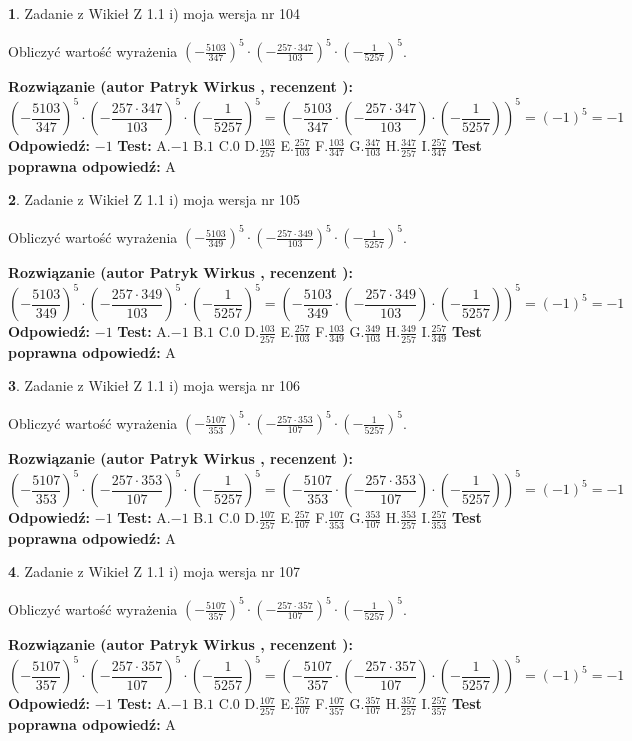 \documentclass[12pt, a4paper]{article}
\theoremstyle{definition} %
\newtheorem{zad}{}
\newcommand{\zadStart}[1]{\begin{zad}#1\newline}
\newcommand{\zadStop}{\end{zad}}
\newcommand{\rozwStart}[2]{\noindent \textbf{Rozwiązanie (autor #1 , recenzent #2): }\newline}
\newcommand{\rozwStop}{\newline}
\newcommand{\odpStart}{\noindent \textbf{Odpowiedź:}\newline}
\newcommand{\odpStop}{\newline}
\newcommand{\testStart}{\noindent \textbf{Test:}\newline}
\newcommand{\testStop}{\newline}
\newcommand{\kluczStart}{\noindent \textbf{Test poprawna odpowiedź:}\newline}
\newcommand{\kluczStop}{\newline}
\begin{document}
\zadStart{Zadanie z Wikieł Z 1.1 i) moja wersja nr 104}

Obliczyć wartość wyrażenia $(-\frac{5103}{347})^{5} \cdot (-\frac{257 \cdot 347}{103})^{5} \cdot (-\frac{1}{5257})^{5}$.
\zadStop
\rozwStart{Patryk Wirkus}{}
$$(-\frac{5103}{347})^{5} \cdot (-\frac{257 \cdot 347}{103})^{5} \cdot (-\frac{1}{5257})^{5} = (-\frac{5103}{347} \cdot (-\frac{257 \cdot 347}{103}) \cdot (-\frac{1}{5257}))^{5} = (-1)^{5} = -1$$
\rozwStop
\odpStart
$-1$
\odpStop
\testStart
A.$-1$ B.$1$ C.$0$ D.$\frac{103}{257}$ E.$\frac{257}{103}$
F.$\frac{103}{347}$ G.$\frac{347}{103}$
H.$\frac{347}{257}$
I.$\frac{257}{347}$
\testStop
\kluczStart
A
\kluczStop



\zadStart{Zadanie z Wikieł Z 1.1 i) moja wersja nr 105}

Obliczyć wartość wyrażenia $(-\frac{5103}{349})^{5} \cdot (-\frac{257 \cdot 349}{103})^{5} \cdot (-\frac{1}{5257})^{5}$.
\zadStop
\rozwStart{Patryk Wirkus}{}
$$(-\frac{5103}{349})^{5} \cdot (-\frac{257 \cdot 349}{103})^{5} \cdot (-\frac{1}{5257})^{5} = (-\frac{5103}{349} \cdot (-\frac{257 \cdot 349}{103}) \cdot (-\frac{1}{5257}))^{5} = (-1)^{5} = -1$$
\rozwStop
\odpStart
$-1$
\odpStop
\testStart
A.$-1$ B.$1$ C.$0$ D.$\frac{103}{257}$ E.$\frac{257}{103}$
F.$\frac{103}{349}$ G.$\frac{349}{103}$
H.$\frac{349}{257}$
I.$\frac{257}{349}$
\testStop
\kluczStart
A
\kluczStop



\zadStart{Zadanie z Wikieł Z 1.1 i) moja wersja nr 106}

Obliczyć wartość wyrażenia $(-\frac{5107}{353})^{5} \cdot (-\frac{257 \cdot 353}{107})^{5} \cdot (-\frac{1}{5257})^{5}$.
\zadStop
\rozwStart{Patryk Wirkus}{}
$$(-\frac{5107}{353})^{5} \cdot (-\frac{257 \cdot 353}{107})^{5} \cdot (-\frac{1}{5257})^{5} = (-\frac{5107}{353} \cdot (-\frac{257 \cdot 353}{107}) \cdot (-\frac{1}{5257}))^{5} = (-1)^{5} = -1$$
\rozwStop
\odpStart
$-1$
\odpStop
\testStart
A.$-1$ B.$1$ C.$0$ D.$\frac{107}{257}$ E.$\frac{257}{107}$
F.$\frac{107}{353}$ G.$\frac{353}{107}$
H.$\frac{353}{257}$
I.$\frac{257}{353}$
\testStop
\kluczStart
A
\kluczStop



\zadStart{Zadanie z Wikieł Z 1.1 i) moja wersja nr 107}

Obliczyć wartość wyrażenia $(-\frac{5107}{357})^{5} \cdot (-\frac{257 \cdot 357}{107})^{5} \cdot (-\frac{1}{5257})^{5}$.
\zadStop
\rozwStart{Patryk Wirkus}{}
$$(-\frac{5107}{357})^{5} \cdot (-\frac{257 \cdot 357}{107})^{5} \cdot (-\frac{1}{5257})^{5} = (-\frac{5107}{357} \cdot (-\frac{257 \cdot 357}{107}) \cdot (-\frac{1}{5257}))^{5} = (-1)^{5} = -1$$
\rozwStop
\odpStart
$-1$
\odpStop
\testStart
A.$-1$ B.$1$ C.$0$ D.$\frac{107}{257}$ E.$\frac{257}{107}$
F.$\frac{107}{357}$ G.$\frac{357}{107}$
H.$\frac{357}{257}$
I.$\frac{257}{357}$
\testStop
\kluczStart
A
\kluczStop
\end{document}

